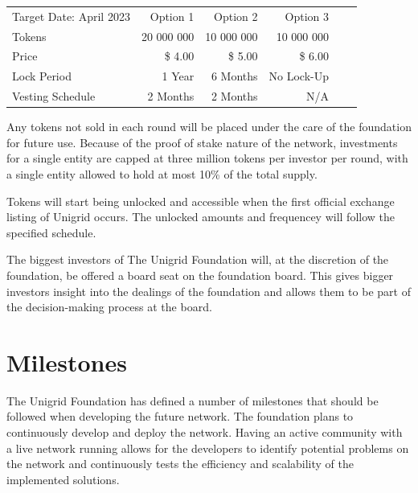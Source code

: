 \documentclass{article}
\begin{document}
\renewcommand{\arraystretch}{1.5}%
\begin{flushleft}
	\hypersetup{colorlinks = true, urlcolor = black, citecolor = black, linkcolor = black}
	\center \small
	\begin{tabular}{lrrrrr}
		\rowcolor{orange}\color{black}Target Date: April 2023\hspace{2.4cm} & \color{black}Option 1 & \color{black}Option 2 & \color{black}Option 3\\
		Tokens                               &  20 000 000 & 10 000 000 & 10 000 000 \\
		\rowcolor{headerbgl}Price            &  \$ 4.00    & \$ 5.00    & \$ 6.00 \\
		Lock Period                          &  1 Year     &  6 Months  & No Lock-Up \\
		\rowcolor{headerbgl}Vesting Schedule &  2 Months   & 2 Months & N/A 
	\end{tabular}
\end{flushleft}

\vspace{0.6cm}
\noindent Any tokens not sold in each round will be placed under the care of the foundation for future use. Because of the proof of stake nature of the  network, investments for a single entity are capped at three million tokens per investor per round, with a single entity allowed to hold at most 10\% of the total supply.

\noindent Tokens will start being unlocked and accessible when the first official exchange listing of Unigrid occurs. The unlocked amounts and frequencey will follow the specified schedule.

The biggest investors of The Unigrid Foundation will, at the discretion of the foundation, be offered a board seat on the foundation board. This gives bigger investors insight into the dealings of the foundation and allows them to be part of the decision-making process at the board.

\section{Milestones}
The Unigrid Foundation has defined a number of milestones that should be followed when developing the future network. The foundation plans to continuously develop and deploy the network. Having an active community with a live network running allows for the developers to identify potential problems on the network and continuously tests the efficiency and scalability of the implemented solutions.
\end{document}
